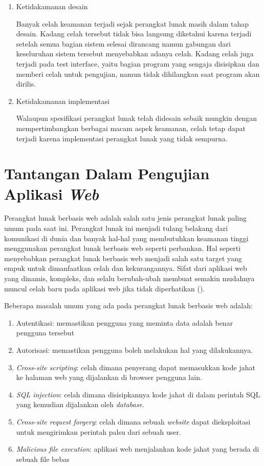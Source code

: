 \begin{enumerate}
    \item Ketidakamanan desain

    Banyak celah keamanan terjadi sejak perangkat lunak masih dalam tahap desain.
    Kadang celah tersebut tidak bisa langsung diketahui karena terjadi setelah semua
    bagian sistem selesai dirancang namun gabungan dari keseluruhan sistem tersebut
    menyebabkan adanya celah.
    Kadang celah juga terjadi pada test interface, yaitu bagian program yang sengaja
    disisipkan dan memberi celah untuk pengujian, namun tidak dihilangkan saat program akan dirilis.

    \item Ketidakamanan implementasi

    Walaupun spesifikasi perangkat lunak telah didesain sebaik mungkin dengan
    mempertimbangkan berbagai macam aspek keamanan,
    celah tetap dapat terjadi karena implementasi perangkat lunak yang tidak sempurna.

\end{enumerate} 

\section{Tantangan Dalam Pengujian Aplikasi \emph{Web}}

Perangkat lunak berbasis web adalah salah satu jenis perangkat lunak paling umum pada saat ini.
Perangkat lunak ini menjadi tulang belakang dari komunikasi di dunia dan banyak hal-hal
yang membutuhkan keamanan tinggi menggunakan perangkat lunak berbasis web seperti perbankan.
Hal seperti menyebabkan perangkat lunak berbasis web menjadi salah satu target yang empuk untuk
dimanfaatkan celah dan kekurangannya. Sifat dari aplikasi web yang dinamis, kompleks, dan
selalu berubah-ubah membuat semakin mudahnya muncul celah baru
pada aplikasi web jika tidak diperhatikan (\cite{websecchal}).

Beberapa masalah umum yang ada pada perangkat lunak berbasis web adalah:
\begin{enumerate}
    \item Autentikasi: memastikan pengguna yang meminta data adalah benar pengguna tersebut
    \item Autorisasi: memastikan pengguna boleh melakukan hal yang dilakukannya.

    \item \emph{Cross-site scripting}:
    celah dimana penyerang dapat memasukkan kode jahat ke halaman web yang dijalankan di browser pengguna lain.

    \item \emph{SQL injection}:
    celah dimana disisipkannya kode jahat di dalam perintah SQL yang kemudian dijalankan oleh \emph{database}.

    \item \emph{Cross-site request forgery}:
    celah dimana sebuah \emph{website} dapat dieksploitasi untuk mengirimkan perintah palsu dari sebuah user.

    \item \emph{Malicious file execution}:
    aplikasi web menjalankan kode jahat yang berada di sebuah file bebas
\end{enumerate}

